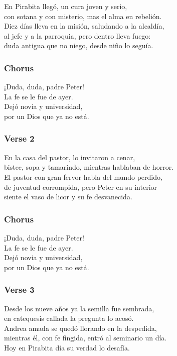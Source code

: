 En Pirabita llegó, un cura joven y serio,\\
con sotana y con misterio, mas el alma en rebelión.\\
Diez días lleva en la misión, saludando a la alcaldía,\\
al jefe y a la parroquia, pero dentro lleva fuego:\\
duda antigua que no niego, desde niño lo seguía.

\subsubsection{Chorus}\label{chorus-36}

¡Duda, duda, padre Peter!\\
La fe se le fue de ayer.\\
Dejó novia y universidad,\\
por un Dios que ya no está.

\subsubsection{Verse 2}\label{verse-2-15}

En la casa del pastor, lo invitaron a cenar,\\
bistec, sopa y tamarindo, mientras hablaban de horror.\\
El pastor con gran fervor habla del mundo perdido,\\
de juventud corrompida, pero Peter en su interior\\
siente el vaso de licor y su fe desvanecida.

\subsubsection{Chorus}\label{chorus-37}

¡Duda, duda, padre Peter!\\
La fe se le fue de ayer.\\
Dejó novia y universidad,\\
por un Dios que ya no está.

\subsubsection{Verse 3}\label{verse-3-8}

Desde los nueve años ya la semilla fue sembrada,\\
en catequesis callada la pregunta lo acosó.\\
Andrea amada se quedó llorando en la despedida,\\
mientras él, con fe fingida, entró al seminario un día.\\
Hoy en Pirabita día su verdad lo desafía.

